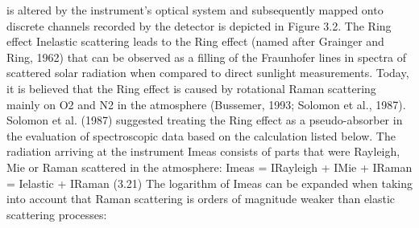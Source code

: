 \documentclass  [
  paper    = a4,
  BCOR     = 10mm,
  twoside,
  fontsize = 12pt,
  fleqn,
  toc      = bibnumbered,
  toc      = listofnumbered,
  numbers  = noendperiod,
  headings = normal,
  listof   = leveldown,
  version  = 3.03
]                                       {scrreprt}
\begin{document}
 is altered by the instrument’s optical system and subsequently mapped
	onto discrete channels recorded by the detector is depicted in Figure 3.2.
	The Ring effect
	Inelastic scattering leads to the Ring effect (named after Grainger and Ring, 1962)
	that can be observed as a filling of the Fraunhofer lines in spectra of scattered
	solar radiation when compared to direct sunlight measurements. Today, it is
	believed that the Ring effect is caused by rotational Raman scattering mainly on
	O2 and N2 in the atmosphere (Bussemer, 1993; Solomon et al., 1987). Solomon
	et al. (1987) suggested treating the Ring effect as a pseudo-absorber in the
	evaluation of spectroscopic data based on the calculation listed below.
	The radiation arriving at the instrument Imeas consists of parts that were
	Rayleigh, Mie or Raman scattered in the atmosphere:
	Imeas = IRayleigh + IMie + IRaman = Ielastic + IRaman (3.21)
	The logarithm of Imeas can be expanded when taking into account that Raman
	scattering is orders of magnitude weaker than elastic scattering processes:
\end{document}
